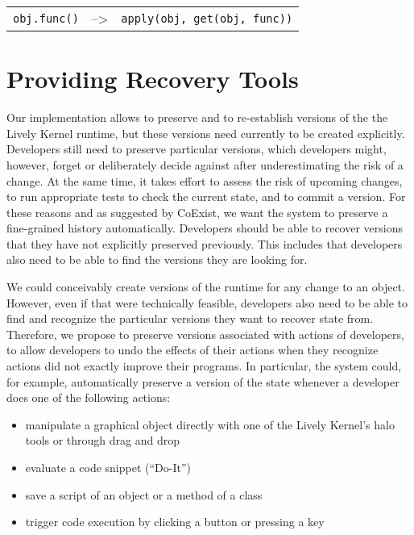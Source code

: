 \begin{center}
    \begin{tabular}{ lll }
    \lstinline|obj.func()| & --> & \lstinline|apply(obj, get(obj, func))| \\
    \end{tabular}
\end{center}


\section{Providing Recovery Tools}

Our implementation allows to preserve and to re-establish versions of the the Lively Kernel runtime, but these versions need currently to be created explicitly.
Developers still need to preserve particular versions, which developers might, however, forget or deliberately decide against after underestimating the risk of a change.
At the same time, it takes effort to assess the risk of upcoming changes, to run appropriate tests to check the current state, and to commit a version.
For these reasons and as suggested by CoExist, we want the system to preserve a fine-grained history automatically.
Developers should be able to recover versions that they have not explicitly preserved previously.
This includes that developers also need to be able to find the versions they are looking for.

We could conceivably create versions of the runtime for any change to an object.
However, even if that were technically feasible, developers also need to be able to find and recognize the particular versions they want to recover state from.
Therefore, we propose to preserve versions associated with actions of developers, to allow developers to undo the effects of their actions when they recognize actions did not exactly improve their programs.
In particular, the system could, for example, automatically preserve a version of the state whenever a developer does one of the following actions:
\begin{itemize}
    \item manipulate a graphical object directly with one of the Lively Kernel's halo tools or through drag and drop
    \item evaluate a code snippet (``Do-It'')
    \item save a script of an object or a method of a class
    \item trigger code execution by clicking a button or pressing a key
\end{itemize}

